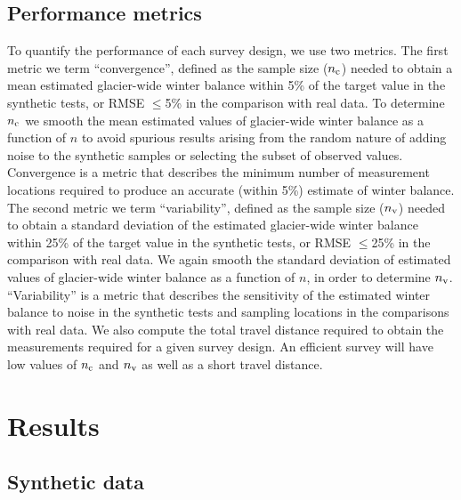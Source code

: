 \documentclass[twocolumn,letterpaper]{igs}
\begin{document}
 \subsection{Performance metrics}
 
To quantify the performance of each survey design, we use two metrics. The first metric we term ``convergence'', defined as the sample size ($n_{\rm c}$) needed to obtain a mean estimated glacier-wide winter balance within 5\% of the target value in the synthetic tests, or RMSE $\leq$5\% in the comparison with real data. To determine $n_{\rm c}$ we smooth the mean estimated values of glacier-wide winter balance as a function of $n$ to avoid spurious results arising from the random nature of adding noise to the synthetic samples or selecting the subset of observed values.
Convergence is a metric that describes the minimum number of measurement locations required to produce an accurate (within 5\%) estimate of winter balance. The second metric we term ``variability'', defined as the sample size ($n_{\rm v}$) needed to obtain a standard deviation of the estimated glacier-wide winter balance within 25\% of the target value in the synthetic tests, or RMSE $\leq$25\% in the comparison with real data. We again smooth the standard deviation of estimated values of glacier-wide winter balance as a function of $n$, in order to determine $n_{\rm v}$. 
``Variability'' is a metric that describes the sensitivity of the estimated winter balance to noise in the synthetic tests and sampling locations in the comparisons with real data.
We also compute the total travel distance required to obtain the measurements required for a given survey design. An efficient survey will have low values of  $n_{\rm c}$ and $n_{\rm v}$ as well as a short travel distance. 

\section{Results }

\subsection{Synthetic data}
\end{document}
